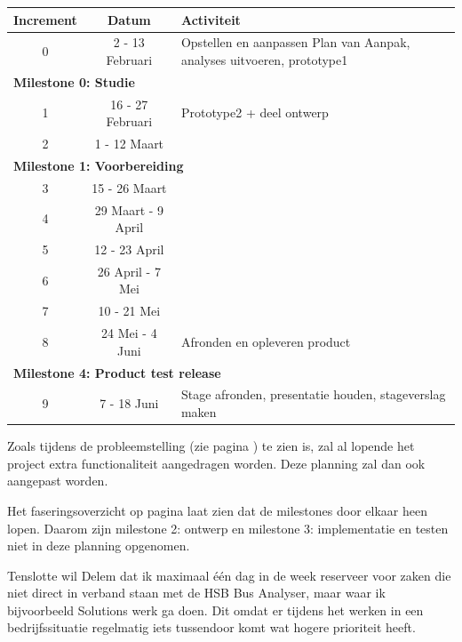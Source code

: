 \begin{tabularx}{\textwidth}{|c|c|X|}
\hline
Increment&Datum&Activiteit\\
\hline
0&2 - 13 Februari&Opstellen en aanpassen Plan van Aanpak, analyses uitvoeren, prototype1\\
\hline
\multicolumn{3}{|l|}{\textbf{Milestone 0: Studie}}\\
\hline
1&16 - 27 Februari&Prototype2 + deel ontwerp\\
2&1 - 12 Maart&\\
\hline
\multicolumn{3}{|l|}{\textbf{Milestone 1: Voorbereiding}}\\
\hline
3&15 - 26 Maart&\\
4&29 Maart - 9 April&\\
5&12 - 23 April&\\
6&26 April - 7 Mei&\\
7&10 - 21 Mei&\\
8&24 Mei - 4 Juni&Afronden en opleveren product\\
\hline
\multicolumn{3}{|l|}{\textbf{Milestone 4: Product test release}}\\
\hline
9&7 - 18 Juni&Stage afronden, presentatie houden, stageverslag maken\\
\hline
\end{tabularx}

Zoals tijdens de probleemstelling (zie pagina \pageref{probleemstelling}) te zien is, zal al lopende het project extra functionaliteit aangedragen worden. Deze planning zal dan ook aangepast worden.

Het faseringsoverzicht op pagina \pageref{faseringoverzicht} laat zien dat de milestones door elkaar heen lopen. Daarom zijn milestone 2: ontwerp en milestone 3: implementatie en testen niet in deze planning opgenomen.

Tenslotte wil Delem dat ik maximaal \'e\'en dag in de week reserveer voor zaken die niet direct in verband staan met de HSB Bus Analyser, maar waar ik bijvoorbeeld Solutions werk ga doen. Dit omdat er tijdens het werken in een bedrijfssituatie regelmatig iets tussendoor komt wat hogere prioriteit heeft.
